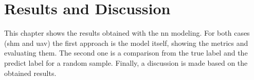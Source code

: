 \chapter{Results and Discussion}\label{sec:results}

This chapter shows the results obtained with the \gls*{nn} modeling.
For both cases (\gls*{shm} and \gls*{uav}) the first approach is the model itself, showing the metrics and evaluating them.
The second one is a comparison from the true label and the predict label for a random sample.
Finally, a discussion is made based on the obtained results. 